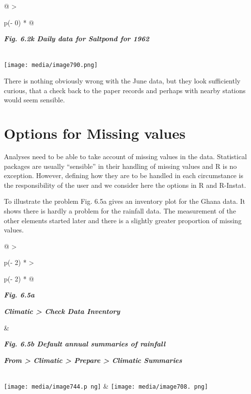\documentclass[
  letterpaper,
  DIV=11,
  numbers=noendperiod]{scrreprt}
\begin{document}
\begin{longtable}[]{@{}
  >{\raggedright\arraybackslash}p{(\columnwidth - 0\tabcolsep) * }@{}}
\toprule\noalign{}
\begin{minipage}[b]{\linewidth}\raggedright
\textbf{\emph{Fig. 6.2k Daily data for Saltpond for 1962}}
\end{minipage} \\
\midrule\noalign{}
\endhead
\bottomrule\noalign{}
\endlastfoot
\texttt{[image: media/image790.png]} \\
\end{longtable}

There is nothing obviously wrong with the June data, but they look
sufficiently curious, that a check back to the paper records and perhaps
with nearby stations would seem sensible.

\section{Options for Missing values}\label{options-for-missing-values}

Analyses need to be able to take account of missing values in the data.
Statistical packages are usually ``sensible'' in their handling of
missing values and R is no exception. However, defining how they are to
be handled in each circumstance is the responsibility of the user and we
consider here the options in R and R-Instat.

To illustrate the problem Fig. 6.5a gives an inventory plot for the
Ghana data. It shows there is hardly a problem for the rainfall data.
The measurement of the other elements started later and there is a
slightly greater proportion of missing values.

\begin{longtable}[]{@{}
  >{\raggedright\arraybackslash}p{(\columnwidth - 2\tabcolsep) * }
  >{\raggedright\arraybackslash}p{(\columnwidth - 2\tabcolsep) * }@{}}
\toprule\noalign{}
\begin{minipage}[b]{\linewidth}\raggedright
\textbf{\emph{Fig. 6.5a}}

\textbf{\emph{Climatic \textgreater{} Check Data Inventory}}
\end{minipage} & \begin{minipage}[b]{\linewidth}\raggedright
\textbf{\emph{Fig. 6.5b Default annual summaries of rainfall}}

\textbf{\emph{From \textgreater{} Climatic \textgreater{} Prepare
\textgreater{} Climatic Summaries}}
\end{minipage} \\
\midrule\noalign{}
\endhead
\bottomrule\noalign{}
\endlastfoot
\texttt{[image: media/image744.p ng]}
&
\texttt{[image: media/image708. png]} \\
\end{longtable}
\end{document}
